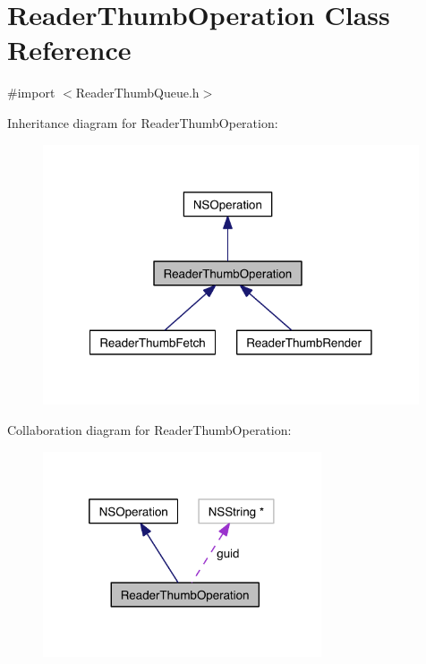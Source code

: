 \hypertarget{interface_reader_thumb_operation}{\section{Reader\-Thumb\-Operation Class Reference}
\label{d1/d35/interface_reader_thumb_operation}
}


{\ttfamily \#import $<$Reader\-Thumb\-Queue.\-h$>$}



Inheritance diagram for Reader\-Thumb\-Operation\-:
\nopagebreak
\begin{figure}[H]
\begin{center}
\leavevmode
\includegraphics[width=315pt]{d6/d0b/interface_reader_thumb_operation__inherit__graph}
\end{center}
\end{figure}


Collaboration diagram for Reader\-Thumb\-Operation\-:
\nopagebreak
\begin{figure}[H]
\begin{center}
\leavevmode
\includegraphics[width=233pt]{d2/d68/interface_reader_thumb_operation__coll__graph}
\end{center}
\end{figure}
